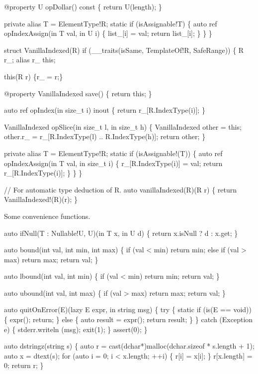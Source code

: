   @property
  U opDollar() const \{ return U(length); \}

  private alias T = ElementType!R;
  static if (isAssignable!T) \{
    auto ref opIndexAssign(in T val, in U i) \{
      list_[i] = val;
      return list_[i];
    \}
  \}
\}

struct VanillaIndexed(R)
  if (__traits(isSame, TemplateOf!R, SafeRange))
\{
  R r_;
  alias r_ this;

  this(R r) \{r_ = r;\}

  @property
  VanillaIndexed save() \{ return this; \}

  auto ref opIndex(in size_t i) inout \{
    return r_[R.IndexType(i)];
  \}

  VanillaIndexed opSlice(in size_t l, in size_t h)
  \{
    VanillaIndexed other = this;
    other.r_ = r_[R.IndexType(l) .. R.IndexType(h)];
    return other;
  \}

  private alias T = ElementType!R;
  static if (isAssignable!(T)) \{
    auto ref opIndexAssign(in T val, in size_t i) \{
      r_[R.IndexType(i)] = val;
      return r_[R.IndexType(i)];
    \}
  \}
\}

// For automatic type deduction of R.
auto vanillaIndexed(R)(R r)
\{
  return VanillaIndexed!(R)(r);
\}

\nwendcode{}Some convenience functions.

\nwenddocs{}\endmoddef\nwstartdeflinemarkup\nwenddeflinemarkup
auto ifNull(T : Nullable!U, U)(in T x, in U d)
\{
  return x.isNull ? d : x.get;
\}

auto bound(int val, int min, int max)
\{
  if (val < min) return min;
  else if (val > max) return max;
  return val;
\}

auto lbound(int val, int min)
\{
  if (val < min) return min;
  return val;
\}

auto ubound(int val, int max)
\{
  if (val > max) return max;
  return val;
\}

auto quitOnError(E)(lazy E expr, in string msg)
\{
  try \{
    static if (is(E == void)) \{
      expr();
      return;
    \} else \{
      auto result = expr();
      return result;
    \}
  \} catch (Exception e) \{
    stderr.writeln (msg);
    exit(1);
  \}
  assert(0);
\}

auto dstringz(string s)
\{
  auto r = cast(dchar*)malloc(dchar.sizeof * s.length + 1);
  auto x = dtext(s);
  for (auto i = 0; i < x.length; ++i) \{
    r[i] = x[i];
  \}
  r[x.length] = 0;
  return r;
\}


